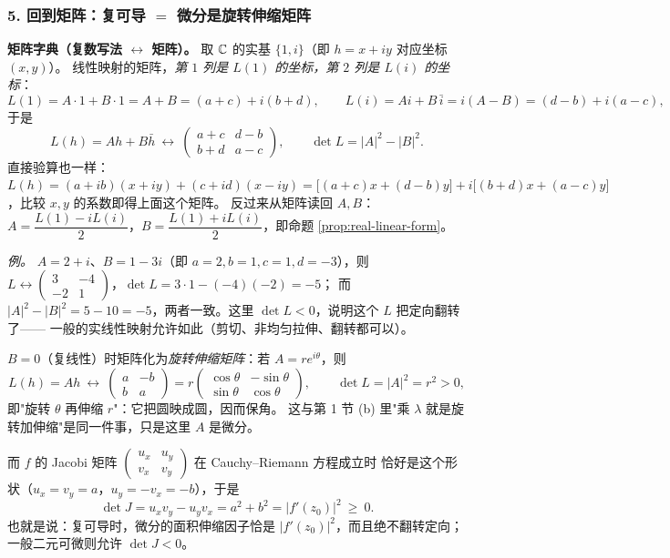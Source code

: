 \subsubsection*{5. 回到矩阵：复可导 $=$ 微分是旋转伸缩矩阵}

\noindent\textbf{矩阵字典（复数写法 $\leftrightarrow$ 矩阵）。}
取 $\mathbb{C}$ 的实基 $\{1,i\}$（即 $h=x+iy$ 对应坐标 $(x,y)$）。
线性映射的矩阵，\emph{第 $1$ 列是 $L(1)$ 的坐标，第 $2$ 列是 $L(i)$ 的坐标}：
\[
L(1)=A\cdot 1+B\cdot 1=A+B=(a+c)+i(b+d),\qquad
L(i)=Ai+B\,\bar i=i(A-B)=(d-b)+i(a-c),
\]
于是
\[
L(h)=Ah+B\bar h\ \longleftrightarrow\ \begin{pmatrix} a+c & d-b\\ b+d & a-c\end{pmatrix},
\qquad \det L=|A|^2-|B|^2 .
\]
直接验算也一样：$L(h)=(a+ib)(x+iy)+(c+id)(x-iy)
=\bigl[(a+c)x+(d-b)y\bigr]+i\bigl[(b+d)x+(a-c)y\bigr]$，比较 $x,y$ 的系数即得上面这个矩阵。
反过来从矩阵读回 $A,B$：$A=\dfrac{L(1)-iL(i)}{2}$，$B=\dfrac{L(1)+iL(i)}{2}$，即命题 \ref{prop:real-linear-form}。

\smallskip
\noindent
\emph{例。} $A=2+i$、$B=1-3i$（即 $a=2,b=1,c=1,d=-3$），则
$L\longleftrightarrow\begin{pmatrix}3&-4\\-2&1\end{pmatrix}$，$\det L=3\cdot1-(-4)(-2)=-5$；
而 $|A|^2-|B|^2=5-10=-5$，两者一致。这里 $\det L<0$，说明这个 $L$ 把定向翻转了——
一般的实线性映射允许如此（剪切、非均匀拉伸、翻转都可以）。

\smallskip
\noindent
$B=0$（复线性）时矩阵化为\emph{旋转伸缩矩阵}：若 $A=re^{i\theta}$，则
\[
L(h)=Ah\ \longleftrightarrow\ \begin{pmatrix} a & -b\\ b & a\end{pmatrix}
=r\begin{pmatrix}\cos\theta & -\sin\theta\\ \sin\theta & \cos\theta\end{pmatrix},
\qquad \det L=|A|^2=r^2>0,
\]
即"旋转 $\theta$ 再伸缩 $r$"：它把圆映成圆，因而保角。
这与第 1 节 (b) 里"乘 $\lambda$ 就是旋转加伸缩"是同一件事，只是这里 $A$ 是微分。

\smallskip
\noindent
而 $f$ 的 Jacobi 矩阵 $\begin{pmatrix}u_x&u_y\\v_x&v_y\end{pmatrix}$ 在 Cauchy--Riemann 方程成立时
恰好是这个形状（$u_x=v_y=a$，$u_y=-v_x=-b$），于是
\[
\det J=u_xv_y-u_yv_x=a^2+b^2=|f'(z_0)|^2\ \ge\ 0 .
\]
也就是说：复可导时，微分的面积伸缩因子恰是 $|f'(z_0)|^2$，而且绝不翻转定向；一般二元可微则允许 $\det J<0$。

